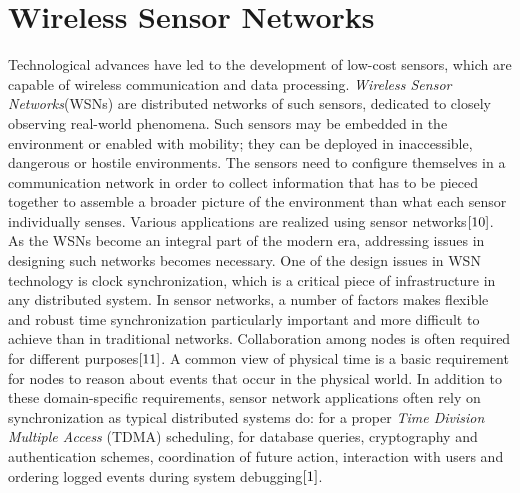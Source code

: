 \documentclass[a4paper,10pt]{report}
\begin{document}
\section{\textbf{Wireless Sensor Networks}}
\noindent Technological advances have led to the development of low-cost sensors, which are capable of wireless communication and
data processing. \textit{Wireless Sensor Networks}(WSNs) are distributed networks of such sensors, dedicated to closely observing
real-world phenomena. Such sensors may be embedded in the environment  or enabled with mobility; they can be deployed in
inaccessible, dangerous or hostile environments. The sensors need to configure themselves in a communication network in order to collect
information that has to be pieced together to assemble a broader picture of the environment than what each sensor individually
senses. Various applications are realized using sensor networks$\cite{10}$. As the WSNs become an integral part of the modern era, addressing issues in designing such networks becomes necessary.
\newline One of the design issues in WSN technology is clock synchronization, which is a critical piece of infrastructure in any
distributed system. In sensor networks, a number of factors makes flexible and robust time synchronization particularly important and
more difficult to achieve than in traditional networks.
\newline
Collaboration among nodes is often required for different purposes$\cite{11}$. A common view of physical time is a basic
requirement for nodes to reason about events that occur in the physical world. In addition to these domain-specific requirements,
sensor network applications often rely on synchronization as typical distributed systems do: for a proper \textit{Time Division Multiple Access} (TDMA) scheduling, for database queries, cryptography and authentication schemes, coordination of future action, interaction with users and ordering logged events during system debugging$\cite{1}$.
\end{document}
